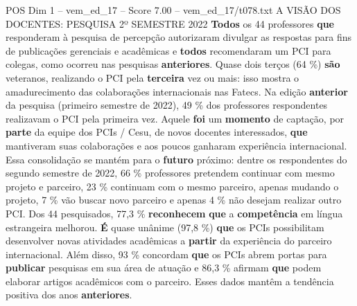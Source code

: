 \begin{textsample}{POS Dim 1 – vem\_ed\_17 – Score 7.00 – vem\_ed\_17/t078.txt}  \label{ex:f1_pos_134}
A VISÃO DOS DOCENTES: PESQUISA 2º SEMESTRE 2022 \textbf{Todos} os 44 professores \textbf{que} responderam à pesquisa de percepção autorizaram divulgar as respostas para fins de publicações gerenciais e acadêmicas e \textbf{todos} recomendaram um PCI para colegas, como ocorreu nas pesquisas \textbf{anteriores}.
Quase dois terços (64 \%) \textbf{são} veteranos, realizando o PCI pela \textbf{terceira} vez ou mais: isso mostra o amadurecimento das colaborações internacionais nas Fatecs.
Na edição \textbf{anterior} da pesquisa (primeiro semestre de 2022), 49 \% dos professores respondentes realizavam o PCI pela primeira vez.
Aquele \textbf{foi} um \textbf{momento} de captação, por \textbf{parte} da equipe dos PCIs / Cesu, de novos docentes interessados, \textbf{que} mantiveram suas colaborações e aos poucos ganharam experiência internacional.
Essa consolidação se mantém para o \textbf{futuro} próximo: dentre os respondentes do segundo semestre de 2022, 66 \% professores pretendem continuar com mesmo projeto e parceiro, 23 \% continuam com o mesmo parceiro, apenas mudando o projeto, 7 \% vão buscar novo parceiro e apenas 4 \% não desejam realizar outro PCI.
Dos 44 pesquisados, 77,3 \% \textbf{reconhecem} \textbf{que} a \textbf{competência} em língua estrangeira melhorou. \textbf{É} quase unânime (97,8 \%) \textbf{que} os PCIs possibilitam desenvolver novas atividades acadêmicas a \textbf{partir} da experiência do parceiro internacional.
Além disso, 93 \% concordam \textbf{que} os PCIs abrem portas para \textbf{publicar} pesquisas em sua área de atuação e 86,3 \% afirmam \textbf{que} podem elaborar artigos acadêmicos com o parceiro.
Esses dados mantêm a tendência positiva dos anos \textbf{anteriores}.

\end{textsample}
